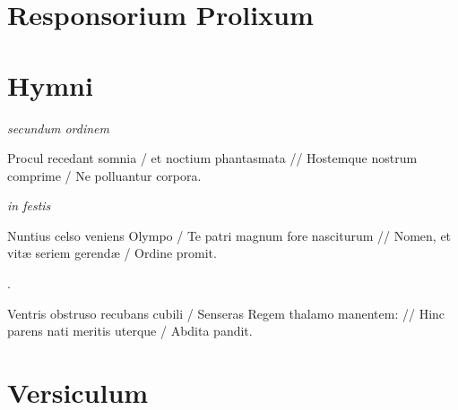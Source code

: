 \documentclass[initial=ZallmanCaps,staff=19,font=greciliae,11pt,a4paper,openany,twoside,choralsign=PfefferMediaeval]{gregorian}
\begin{document}
\section*{Responsorium Prolixum}
\newpage
\section*{Hymni}
\textit{secundum ordinem}\par
{}\par
\begin{multicols}{2}\setlength{\columnseprule}{0.2px}
Procul recedant somnia / et noctium phantasmata // Hostemque nostrum comprime / Ne polluantur corpora.\par
{}\par
\end{multicols}
\textit{in festis}\par
{}
\par
\vskip9bp
\begin{multicols}{2}\setlength{\columnseprule}{0.2px}
Nuntius celso veniens Olympo / Te patri magnum fore nasciturum // Nomen, et vitæ seriem gerendæ / Ordine promit.\par
{}.\par\vfill\columnbreak
Ventris obstruso recubans cubili / Senseras Regem thalamo manentem: // Hinc parens nati meritis uterque / Abdita pandit.\par
{}\par
\end{multicols}\par\vskip9mm
\section*{Versiculum}
\newpage
\end{document}
